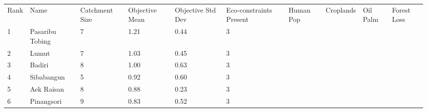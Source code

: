 \begin{table}[ht]
\centering
\begingroup\fontsize{8pt}{9pt}\selectfont
\begin{tabular}{C{0.03\textwidth}C{0.12\textwidth}C{0.09\textwidth}C{0.08\textwidth}C{0.08\textwidth}C{0.08\textwidth}C{0.07\textwidth}C{0.07\textwidth}C{0.07\textwidth}C{0.07\textwidth}}
 Rank & Name & Catchment Size & Objective Mean & Objective Std Dev & Eco-constraints  Present & Human Pop & Croplands & Oil Palm & Forest Loss \\ 
 {1} & Pasaribu Tobing &   7 & \textcolor[HTML]{FFFFFF}{1.21} & \textcolor[HTML]{000000}{0.44} & \textcolor[HTML]{FFFFFF}{3} &  &  &  &  \\ 
  {2} & Lumut &   7 & \textcolor[HTML]{FFFFFF}{1.03} & \textcolor[HTML]{FFFFFF}{0.45} & \textcolor[HTML]{FFFFFF}{3} &  &  &  &  \\ 
  {3} & Badiri &   8 & \textcolor[HTML]{FFFFFF}{1.00} & \textcolor[HTML]{FFFFFF}{0.63} & \textcolor[HTML]{FFFFFF}{3} &  &  &  &  \\ 
  {4} & Sibabangun &   5 & \textcolor[HTML]{FFFFFF}{0.92} & \textcolor[HTML]{FFFFFF}{0.60} & \textcolor[HTML]{FFFFFF}{3} &  &  &  &  \\ 
  {5} & Aek Raisan &   8 & \textcolor[HTML]{000000}{0.88} & \textcolor[HTML]{000000}{0.23} & \textcolor[HTML]{FFFFFF}{3} &  &  &  &  \\ 
  {6} & Pinangsori &   9 & \textcolor[HTML]{000000}{0.83} & \textcolor[HTML]{FFFFFF}{0.52} & \textcolor[HTML]{FFFFFF}{3} &  &  &  &  \\ 

\end{tabular}
\end{table}
